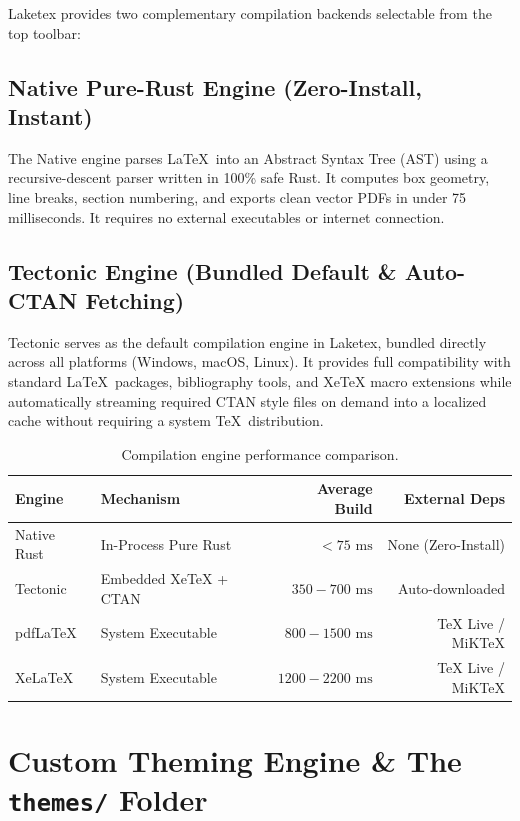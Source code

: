 \documentclass[11pt, a4paper]{article}
\begin{document}
Laketex provides two complementary compilation backends selectable from the top toolbar:

\subsection{Native Pure-Rust Engine (Zero-Install, Instant)}
The Native engine parses \LaTeX\ into an Abstract Syntax Tree (AST) using a recursive-descent parser written in 100\% safe Rust. It computes box geometry, line breaks, section numbering, and exports clean vector PDFs in under 75 milliseconds. It requires no external executables or internet connection.

\subsection{Tectonic Engine (Bundled Default \& Auto-CTAN Fetching)}
Tectonic serves as the default compilation engine in Laketex, bundled directly across all platforms (Windows, macOS, Linux). It provides full compatibility with standard \LaTeX\ packages, bibliography tools, and XeTeX macro extensions while automatically streaming required CTAN style files on demand into a localized cache without requiring a system \TeX\ distribution.

\begin{table}[htbp]
\centering
\begin{tabular}{llrr}
\toprule
\textbf{Engine} & \textbf{Mechanism} & \textbf{Average Build} & \textbf{External Deps} \\
\midrule
Native Rust & In-Process Pure Rust & $< 75\text{ ms}$ & None (Zero-Install) \\
Tectonic & Embedded XeTeX + CTAN & $350 - 700\text{ ms}$ & Auto-downloaded \\
pdfLaTeX & System Executable & $800 - 1500\text{ ms}$ & TeX Live / MiKTeX \\
XeLaTeX & System Executable & $1200 - 2200\text{ ms}$ & TeX Live / MiKTeX \\
\bottomrule
\end{tabular}
\caption{Compilation engine performance comparison.}
\label{tab:engine_perf}
\end{table}

\section{Custom Theming Engine \& The \texttt{themes/} Folder}
\label{sec:theming}
\end{document}
